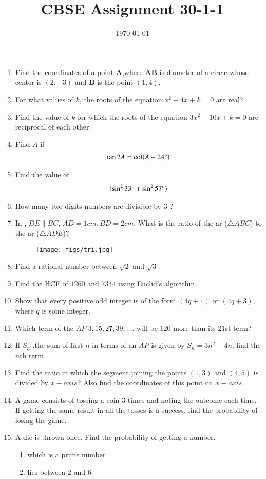 \documentclass[12pt,-letter paper]{article}
\title{CBSE Assignment 30-1-1}
\date{\today}
\let\vec\mathbf{}
\let\vec\mathbf{}
\let\vec\mathbf{}
\providecommand{\brak}[1]{\ensuremath{\left(#1\right)}}\graphicspath{{/storage/self/primary/Download/latexnew/fig}}
\begin{document}
\maketitle{}
\begin{enumerate} 
\item Find the coordinates of a point $\vec{A}$,where $\vec{AB}$ is diameter of a circle whose center is $\brak{2,-3}$ and $\vec{B}$ is the point $\brak{1,4}$.
\item For what values of $k$, the roots of the equation  $ x^2+4x+k = 0  $ are real?


\item Find the value of $k$ for which the roots of the equation  $ 3x^2-10x+k=0  $ are reciprocal of each other.
\item Find $A$ if \begin{align*}\tan 2A = \cot (A-24\degree)\end{align*}
\item Find the value of \begin{align*}(\sin^2 33\degree+ \sin^2 57\degree)\end{align*}
\item How many two digits numbers are divisible by $3$ ?
\item In , $DE \parallel BC$, $ AD = 1 cm , BD = 2 cm$. What is the ratio of the ar ($\triangle ABC$) to  the 
  ar ($\triangle ADE$)?
		\begin{figure}[H]
			\centering
			\texttt{[image: figs/tri.jpg]}
			\caption{}
			\label{fig:figure1}
			
			
		\end{figure}  
\item Find a rational number between $\sqrt{2}$ and $\sqrt{3}$.
\item Find the HCF of $1260$ and $7344$ using Euclid's algorithm.
\item Show that every positive odd integer is of the form $\brak{4q+1}$ or $\brak{4q+3}$, where $q$ is some integer.
\item Which term of the $AP$ $3, 15, 27, 39, ....$ will be $120$ more than its $21$st term?
\item If $S_n$ ,the sum of first $n$ in terms of an $AP$ is given by $S_n=3n^2-4n$, find the $n$th term.
\item Find the ratio in which the segment joining the points $\brak{1, 3}$ and $\brak{4, 5}$ is divided by $x-axis$? Also find the coordinates of this point on
 $x-axis$.
\item A game consists of tossing a coin $3$ times and noting the outcome each time. If getting the same result in all the tosses is a success, find the probability of losing the game.
\item A die is thrown once. Find the probability of getting a number. 
\begin{enumerate}[label={\Roman*.}]
    \item   which is a prime number
    \item  lies between $2$ and $6$.
\end{enumerate}
 



\end{enumerate}
\end{document}
